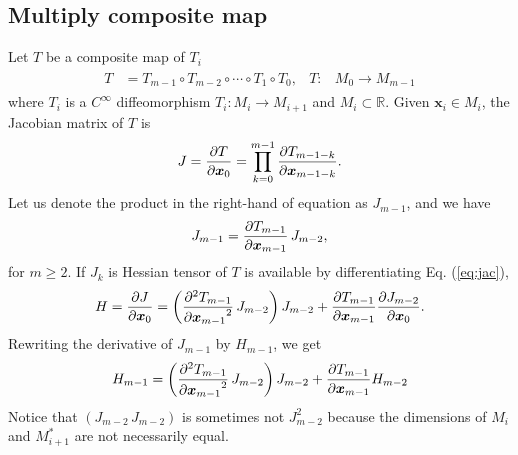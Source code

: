\documentclass[a4paper]{article}
\newcommand{\R}{\mathbb{R}}
\newcommand{\pderiv}[3][1]{%
    \ifthenelse{\equal{#1}{1}}{\frac{\partial #2}{\partial #3}}{\frac{\partial^#1 #2}{{\partial #3}^#1}}
}
\newcommand{\jac}{J}
\newcommand{\hes}{H}
\newcommand{\parens}[1]{\left(#1\right)}
\begin{document}
\subsection{Multiply composite map}
Let $T$ be a composite map of $T_i$
\begin{align}
    \begin{aligned}
        T &= T_{m-1} \circ T_{m-2} \circ \cdots \circ T_1 \circ T_0,
        &
        T: & M_0 \to M_{m-1}
    \end{aligned}
    \end{align}
where $T_i$ is a $C^{\infty}$ diffeomorphism $T_i: M_i \to M_{i+1}$ and $M_i \subset \R$.
Given $\bm x_i \in M_i$, the Jacobian matrix of $T$ is
\begin{align}
    \jac = \pderiv{T}{\bm x_0} = \prod_{k=0}^{m-1} \pderiv{T_{m-1-k}}{\bm x_{m-1-k}}.
\end{align}
Let us denote the product in the right-hand of equation as $\jac_{m-1}$, and we have
\begin{align}
    \jac_{m-1} = \pderiv{T_{m-1}}{\bm x_{m-1}}\, \jac_{m-2},
    \label{eq:jac}
\end{align}
for $m \ge 2$.
If $\jac_{k}$ is
Hessian tensor of $T$ is available by differentiating Eq. (\ref{eq:jac}),
\begin{align}
    \hes = \pderiv{\jac}{\bm x_0}
    =
    \parens{
        \pderiv[2]{T_{m-1}}{\bm x_{m-1}}\,
        \jac_{m-2}
    }
    \jac_{m-2}
    +
    \pderiv{T_{m-1}}{\bm x_{m-1}}
    \pderiv{\jac_{m-2}}{\bm x_0}.
\end{align}
Rewriting the derivative of $\jac_{m-1}$ by $\hes_{m-1}$, we get
\begin{align}
    \hes_{m-1} =
    \parens{
        \pderiv[2]{T_{m-1}}{\bm x_{m-1}}\,
        \jac_{m-2}
    }
    \jac_{m-2}
    +
    \pderiv{T_{m-1}}{\bm x_{m-1}}
    \hes_{m-2}
\end{align}
Notice that $\parens{\jac_{m-2}\, \jac_{m-2}}$ is sometimes not $\jac_{m-2}^2$
because the dimensions of $M_{i}$ and $M_{i+1}^*$
are not necessarily equal.
\clearpage
\end{document}
